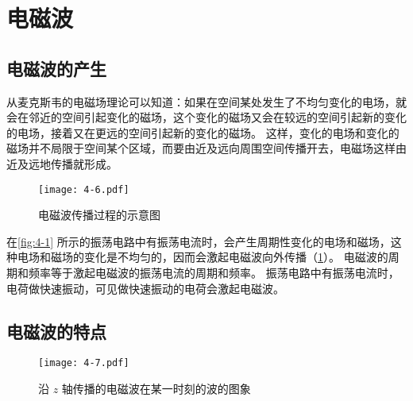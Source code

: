 \section{电磁波}
\subsection{电磁波的产生}
从麦克斯韦的电磁场理论可以知道：如果在空间某处发生了不均匀变化的电场，就会在邻近的空间引起变化的磁场，这个变化的磁场又会在较远的空间引起新的变化的电场，接着又在更远的空间引起新的变化的磁场。
这样，变化的电场和变化的磁场并不局限于空间某个区域，而要由近及远向周围空间传播开去，电磁场这样由近及远地传播就形成。
\begin{figure}
	\texttt{[image: 4-6.pdf]}
	\caption{电磁波传播过程的示意图}\label{fig:4-6}
\end{figure}

在\cref{fig:4-1} 所示的振荡电路中有振荡电流时，会产生周期性变化的电场和磁场，这种电场和磁场的变化是不均匀的，因而会激起电磁波向外传播（\cref{fig:4-6}）。
电磁波的周期和频率等于激起电磁波的振荡电流的周期和频率。
振荡电路中有振荡电流时，电荷做快速振动，可见做快速振动的电荷会激起电磁波。

\subsection{电磁波的特点}
\begin{figure}
	\texttt{[image: 4-7.pdf]}
	\caption{沿 $z$ 轴传播的电磁波在某一时刻的波的图象}\label{fig:4-7}
\end{figure}

